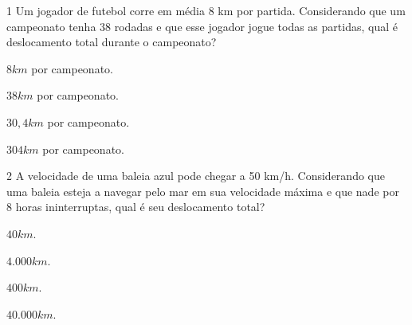 \num{1} Um jogador de futebol corre em média 8 km por partida. Considerando
que um campeonato tenha 38 rodadas e que esse jogador jogue todas as
partidas, qual é deslocamento total durante o campeonato?

\begin{escolha}[itemsep=0pt]
\item $8 km$ por campeonato.
\item $38 km$ por campeonato.
\item $30,4 km$ por campeonato.
\item $304 km$ por campeonato.
\end{escolha}







\num{2} A velocidade de uma baleia azul pode chegar a 50 km/h. Considerando
que uma baleia esteja a navegar pelo mar em sua velocidade máxima e que
nade por 8 horas ininterruptas, qual é seu deslocamento total?

\begin{escolha}[itemsep=0pt]
\item $40 km$.
\item $4.000 km$.
\item $400 km$.
\item $40.000 km$.
\end{escolha}




